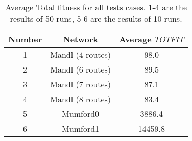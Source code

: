  

\begin{table}[H]
    \centering
    \hspace*{-1.0cm}
    \begin{tabular}{|c|c|c|}
        \hline
        \textbf{Number} & \textbf{Network} & \textbf{Average $TOTFIT$}\\
        \hline
        1 & Mandl (4 routes) & 98.0\\
        
        2 & Mandl (6 routes) & 89.5\\
        
        3 & Mandl (7 routes) & 87.1\\
        
        4 & Mandl (8 routes) & 83.4\\
        
        5 & Mumford0 & 3886.4\\
        
        6 & Mumford1 & 14459.8\\
        \hline
    \end{tabular}
    \caption{Average Total fitness for all tests cases. 1-4 are the results of 50 runs, 5-6 are the results of 10 runs.}
    \label{tabel:averageTotfitAllTestCases}
\end{table}
 












